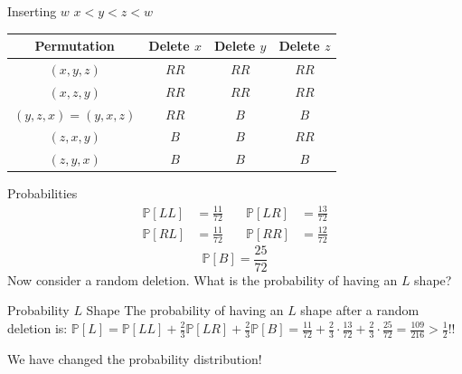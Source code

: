 \documentclass{beamer}
\begin{document}
\begin{frame}{Inserting $w$}
    $x < y < z < w$
    \begin{center}
        \begin{tabular}{||c c c c||} 
            \hline
            Permutation& Delete $x$& Delete $y$ & Delete $z$ \\ [0.5ex] 
            \hline\hline
            $(x,y,z)$ & $RR$ & $RR$ & $RR$ \\ 
            \hline
            $(x,z,y)$ & $RR$ & $RR$ & $RR$ \\  
            \hline
            $(y,z,x) = (y,x,z)$ & $RR$ & $B$ & $B$\\ 
            \hline
            $(z,x,y)$ & $B$ & $B$ & $RR$\\ 
            \hline
            $(z,y,x)$ & $B$ & $B$ & $B$ \\ 
            \hline
        \end{tabular}
    \end{center}
\end{frame}

\begin{frame}{Probabilities}
    \begin{align*}
        \mathbb{P}[LL] &= \frac{11}{72} & \quad \mathbb{P}[LR] &= \frac{13}{72} \\
        \mathbb{P}[RL] &= \frac{11}{72} & \quad \mathbb{P}[RR] &= \frac{12}{72}
    \end{align*}
        $$
        \mathbb{P}[B] = \frac{25}{72}
        $$
        Now consider a random deletion. What is the probability of having an $L$ shape?
    \pause
    \begin{block}{Probability $L$ Shape}
        The probability of having an $L$ shape after a random deletion is: $\mathbb{P}[L] = \mathbb{P}[LL] + \frac{2}{3}  \mathbb{P}[LR] + \frac{2}{3} \mathbb{P}[B] = \frac{11}{72} + \frac{2}{3} \cdot \frac{13}{72} + \frac{2}{3} \cdot \frac{25}{72} = \frac{109}{216} > \frac{1}{2}$!!
    \end{block}
    We have changed the probability distribution!
\end{frame}
\end{document}
